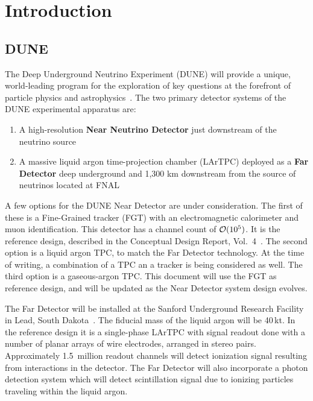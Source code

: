 \section{Introduction}
\subsection{DUNE}

The Deep Underground Neutrino Experiment (DUNE) will provide a unique, world-leading program
for the exploration of key questions at the forefront of particle physics and astrophysics~\cite{sciopps,cdr_vol2}.
The two primary detector systems of the DUNE experimental apparatus are:

\begin{enumerate}

\item A high-resolution \textbf{Near Neutrino Detector} just downstream of the neutrino source
\item A massive liquid argon time-projection chamber (LArTPC) deployed as a \textbf{Far
Detector} deep underground and 1,300 km downstream from the source of neutrinos located at FNAL

\end{enumerate}

\noindent
A few options for the DUNE Near Detector are under consideration.  The first of these is a Fine-Grained tracker (FGT) with
an electromagnetic calorimeter and muon identification.  This detector has a channel count of ${\cal O}(10^{5})$.  It is
the reference design, described in the Conceptual Design Report, Vol.~4~\cite{cdr_vol4_docdb}.  The second option is a liquid argon
TPC, to match the Far Detector technology. At the time of writing, a combination of a TPC an a tracker is being
considered as well. The third option is a gaseous-argon TPC.  This document will use the FGT as reference
design, and will be updated as the Near Detector system design evolves.

The Far Detector will be installed at the Sanford Underground Research Facility in Lead, South Dakota~\cite{surf}.
The fiducial mass of the liquid argon will be 40\,kt. In the reference design it is a single-phase LArTPC
with signal readout done with a number of planar arrays of wire electrodes, arranged in stereo pairs.
Approximately 1.5~million readout channels will detect ionization signal resulting from interactions in the detector. 
The Far Detector will also incorporate a photon detection system which will detect scintillation
signal due to ionizing particles traveling within the liquid argon.

